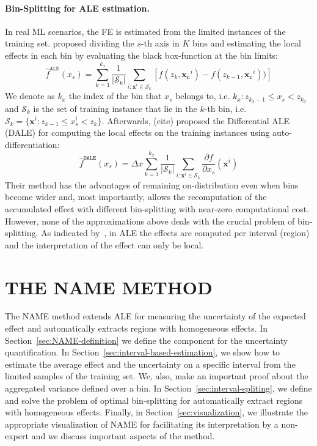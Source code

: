 \documentclass[twoside]{article}
\newcommand{\xc}{\mathbf{x_c}}
\newcommand{\xb}{\mathbf{x}}
\begin{document}
\paragraph{Bin-Splitting for ALE estimation.}

In real ML scenarios, the FE is estimated from the limited instances
of the training set.  \citep{apley2020visualizing} proposed dividing
the \(s\)-th axis in \(K\) bins and estimating the local effects in
each bin by evaluating the black box-function at the bin limits:
\begin{equation}
  \label{eq:ALE_accumulated_mean_est}
  \hat{f}^{\mathtt{ALE}}(x_s) = \sum_{k=1}^{k_x} \frac{1}{|\mathcal{S}_k|} \sum_{i:\mathbf{x}^i \in
    \mathcal{S}_k} \left [ f(z_{k}, \xc^i) - f(z_{k-1}, \xc^i)) \right ]
\end{equation}
We denote as \(k_x\) the index of the bin that \(x_s\) belongs to,
i.e. \(k_x: z_{k_x-1} \leq x_s < z_{k_x} \) and \(\mathcal{S}_k\) is
the set of training instance that lie in the \(k\)-th bin, i.e.
\( \mathcal{S}_k = \{ \xb^i : z_{k-1} \leq x^i_s < z_{k} \}
\). Afterwards, (cite) proposed the Differential ALE (DALE) for
computing the local effects on the training instances using auto-differentiation:
\begin{equation}
  \label{eq:DALE_accumulated_mean_est}
  \hat{f}^{\mathtt{DALE}}(x_s) = \Delta x \sum_{k=1}^{k_x} \frac{1}{|\mathcal{S}_k|} \sum_{i:\mathbf{x}^i \in
    \mathcal{S}_k} \frac{\partial f}{\partial x_s}(\mathbf{x}^i)
\end{equation}
%
Their method has the advantages of remaining on-distribution even when
bins become wider and, most importantly, allows the recomputation of
the accumulated effect with different bin-splitting with near-zero
computational cost. However, none of the approximations above deals
with the crucial problem of bin-splitting. As indicated
by~\citep{molnar2022}, in ALE the effects are computed per interval
(region) and the interpretation of the effect can only be
local.


\section{THE NAME METHOD}
\label{sec:NAME-method}

The NAME method extends ALE for measuring the uncertainty of the
expected effect and automatically extracts regions with homogeneous
effects. In Section~\ref{sec:NAME-definition} we define the component
for the uncertainty quantification. In
Section~\ref{sec:interval-based-estimation}, we show how to estimate
the average effect and the uncertainty on a specific interval from the
limited samples of the training set. We, also, make an important proof
about the aggregated variance defined over a bin. In
Section~\ref{sec:interval-spliting}, we define and solve the problem
of optimal bin-splitting for automatically extract regions with
homogeneous effects. Finally, in Section~\ref{sec:visualization}, we
illustrate the appropriate visualization of NAME for facilitating its
interpretation by a non-expert and we discuss important aspects of the
method.
\end{document}
